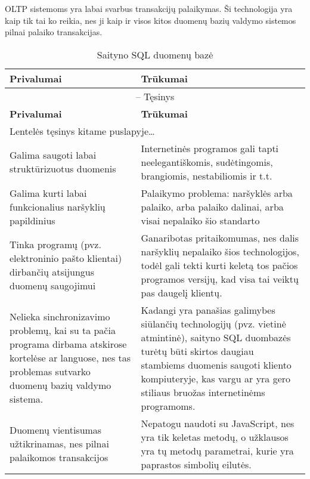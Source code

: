 \documentclass[12pt,a4paper,titlepage]{article}
\begin{document}
OLTP sistemoms yra labai svarbus transakcijų palaikymas. Ši technologija yra kaip tik tai ko reikia, nes ji kaip ir visos kitos duomenų bazių valdymo sistemos pilnai palaiko transakcijas. 

\begin{longtable}{|p{6.4cm}|p{6.4cm}|}
\caption{Saityno SQL duomenų bazė \label{table:web_sql_db}}\\

\hline \hline
{\textbf{Privalumai}} &
{\textbf{Trūkumai}}\\
\hline
\endfirsthead


\multicolumn{2}{c}{{\tablename} \thetable{} -- Tęsinys} \\[0.5ex]
\hline \hline
{\textbf{Privalumai}} &
{\textbf{Trūkumai}}\\
\hline
\endhead


\multicolumn{2}{l}{{Lentelės tęsinys kitame puslapyje\ldots}} \\
\endfoot


\hline \hline
\endlastfoot
\hline 
Galima saugoti labai struktūrizuotus duomenis
&
Internetinės programos gali tapti neelegantiškomis, sudėtingomis, brangiomis, nestabiliomis ir t.t.
\\
\hline
Galima kurti labai funkcionalius naršyklių papildinius
&
Palaikymo problema: naršyklės arba palaiko, arba palaiko dalinai, arba visai nepalaiko šio standarto
\\
\hline
Tinka programų (pvz. elektroninio pašto klientai) dirbančių atsijungus duomenų saugojimui
&
 Ganaribotas pritaikomumas, nes dalis naršyklių nepalaiko šios technologijos, todėl gali tekti kurti keletą tos pačios programos versijų, kad visa tai veiktų pas daugelį klientų.
\\
\hline
Nelieka sinchronizavimo problemų, kai su ta pačia programa dirbama atskirose kortelėse ar languose, nes tas problemas sutvarko duomenų bazių valdymo sistema.
&
Kadangi yra panašias galimybes siūlančių technologijų (pvz. vietinė atmintinė), saityno SQL duombazės turėtų būti skirtos daugiau stambiems duomenis saugoti kliento kompiuteryje, kas vargu ar yra gero stiliaus bruožas internetinėms programoms.
\\
\hline
Duomenų vientisumas užtikrinamas, nes pilnai palaikomos transakcijos
&
Nepatogu naudoti su JavaScript, nes yra tik keletas metodų, o užklausos yra tų metodų parametrai, kurie yra paprastos simbolių eilutės.
\end{longtable}
\end{document}

